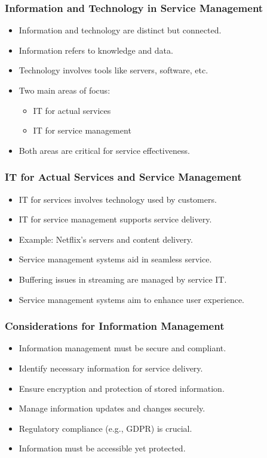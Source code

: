 \documentclass[aspectratio=169, table]{beamer}
\begin{document}
\begin{frame}
	\frametitle{Information and Technology in Service Management}
	\begin{itemize}
		\item Information and technology are distinct but connected.
		\item Information refers to knowledge and data.
		\item Technology involves tools like servers, software, etc.
		\item Two main areas of focus:
		\begin{itemize}
			\item IT for actual services
			\item IT for service management
		\end{itemize}
		\item Both areas are critical for service effectiveness.
	\end{itemize}
\end{frame}

\begin{frame}
	\frametitle{IT for Actual Services and Service Management}
	\begin{itemize}
		\item IT for services involves technology used by customers.
		\item IT for service management supports service delivery.
		\item Example: Netflix's servers and content delivery.
		\item Service management systems aid in seamless service.
		\item Buffering issues in streaming are managed by service IT.
		\item Service management systems aim to enhance user experience.
	\end{itemize}
\end{frame}

\begin{frame}
	\frametitle{Considerations for Information Management}
	\begin{itemize}
		\item Information management must be secure and compliant.
		\item Identify necessary information for service delivery.
		\item Ensure encryption and protection of stored information.
		\item Manage information updates and changes securely.
		\item Regulatory compliance (e.g., GDPR) is crucial.
		\item Information must be accessible yet protected.
	\end{itemize}
\end{frame}
\end{document}
